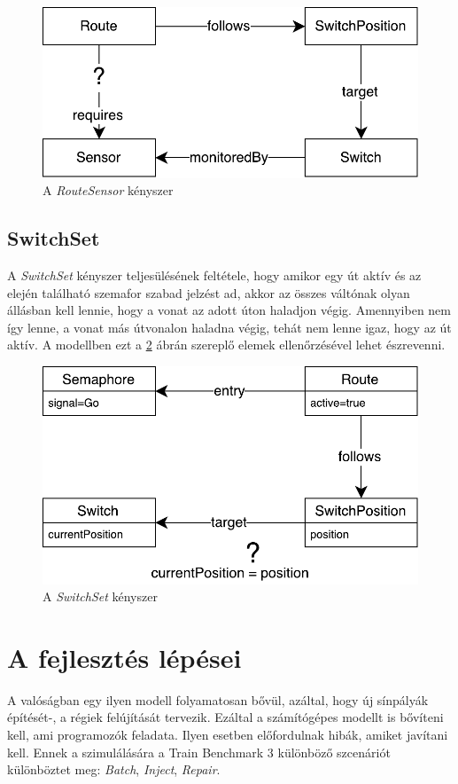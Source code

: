 \begin{figure}[!ht]
	\centering
	\includegraphics[width=0.7\linewidth, keepaspectratio]{figures/RouteSensor.pdf}
	\caption{A \emph{RouteSensor} kényszer}
	\label{fig:RouteSensor}
\end{figure}

\subsection{SwitchSet}

A \emph{SwitchSet} kényszer teljesülésének feltétele, hogy amikor egy út aktív és az elején található szemafor szabad jelzést ad, akkor az összes váltónak olyan állásban kell lennie, hogy a vonat az adott úton haladjon végig. Amennyiben nem így lenne, a vonat más útvonalon haladna végig, tehát nem lenne igaz, hogy az út aktív. A modellben ezt a \ref{fig:SwitchSet} ábrán szereplő elemek ellenőrzésével lehet észrevenni.

\begin{figure}[!ht]
	\centering
	\includegraphics[width=0.7\linewidth, keepaspectratio]{figures/SwitchSet.pdf}
	\caption{A \emph{SwitchSet} kényszer}
	\label{fig:SwitchSet}
\end{figure}


\section{A fejlesztés lépései}

A valóságban egy ilyen modell folyamatosan bővül, azáltal, hogy új sínpályák építését-, a régiek felújítását tervezik. Ezáltal a számítógépes modellt is bővíteni kell, ami programozók feladata. Ilyen esetben előfordulnak hibák, amiket javítani kell. Ennek a szimulálására a Train Benchmark 3 különböző szcenáriót különböztet meg: \emph{Batch}, \emph{Inject}, \emph{Repair}.

